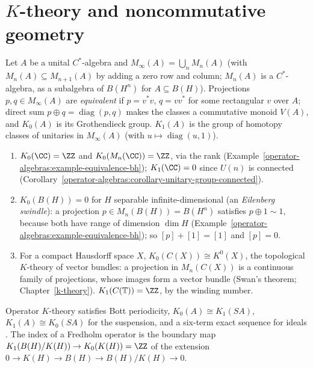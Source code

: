 \section{$K$-theory and noncommutative geometry}\label{operator-algebras:section-noncommutative}

\begin{definition}\label{operator-algebras:definition-k-zero-cstar}
Let $A$ be a unital $C^*$-algebra and $M_\infty(A) = \bigcup_nM_n(A)$ (with $M_n(A) \subseteq M_{n+1}(A)$ by adding a zero row and column; $M_n(A)$ is a $C^*$-algebra, as a subalgebra of $B(H^n)$ for $A \subseteq B(H)$).
Projections $p, q \in M_\infty(A)$ are \emph{equivalent} if $p = v^*v$, $q = vv^*$ for some rectangular $v$ over $A$; direct sum $p \oplus q = \operatorname{diag}(p, q)$ makes the classes a commutative monoid $V(A)$, and
$K_0(A)$ is its Grothendieck group. $K_1(A)$ is the group of homotopy classes of unitaries in $M_\infty(A)$ (with $u \mapsto \operatorname{diag}(u, 1)$).
\end{definition}

\begin{example}\label{operator-algebras:example-k-cstar}
\begin{enumerate}
\item $K_0(\CC) = \ZZ$ and $K_0(M_n(\CC)) = \ZZ$, via the rank (Example~\ref{operator-algebras:example-equivalence-bh}); $K_1(\CC) = 0$ since $U(n)$ is connected (Corollary~\ref{operator-algebras:corollary-unitary-group-connected}).
\item $K_0(B(H)) = 0$ for $H$ separable infinite-dimensional (an \emph{Eilenberg swindle}): a projection $p \in M_n(B(H)) = B(H^n)$ satisfies $p \oplus 1 \sim 1$, because both have range of dimension $\dim H$
(Example~\ref{operator-algebras:example-equivalence-bh}); so $[p] + [1] = [1]$ and $[p] = 0$.
\item For a compact Hausdorff space $X$, $K_0(C(X)) \cong K^0(X)$, the topological $K$-theory of vector bundles: a projection in $M_n(C(X))$ is a continuous family of projections, whose images form a vector bundle (Swan's
theorem; Chapter~\ref{k-theory}). $K_1(C(\mathbb{T})) = \ZZ$, by the winding number.
\end{enumerate}
\end{example}

Operator $K$-theory satisfies Bott periodicity, $K_0(A) \cong K_1(SA)$, $K_1(A) \cong K_0(SA)$ for the suspension, and a six-term exact sequence for ideals \cite{rordam-k-theory}. The index of a Fredholm operator is the
boundary map $K_1(B(H)/K(H)) \to K_0(K(H)) = \ZZ$ of the extension $0 \to K(H) \to B(H) \to B(H)/K(H) \to 0$.

